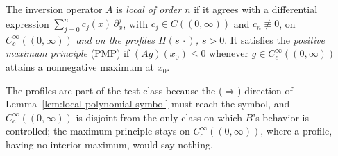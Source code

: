 \begin{definition}\label{def:locality-pmp}
The inversion operator $A$ is \emph{local of order $n$} if it agrees with a differential
expression $\sum_{j=0}^{n} c_j(x)\,\partial_x^j$, with $c_j \in C((0,\infty))$ and
$c_n \not\equiv 0$, on $C_c^\infty((0,\infty))$ \emph{and on the profiles $H(s\,\cdot)$,
$s > 0$}. It satisfies the \emph{positive maximum principle} (PMP) if $(Ag)(x_0) \le 0$
whenever $g \in C_c^\infty((0,\infty))$ attains a nonnegative maximum at $x_0$.

The profiles are part of the test class because the ($\Rightarrow$) direction of
Lemma~\ref{lem:local-polynomial-symbol} must reach the symbol, and $C_c^\infty((0,\infty))$ is
disjoint from the only class on which $B$'s behavior is controlled; the maximum principle
stays on $C_c^\infty((0,\infty))$, where a profile, having no interior maximum, would say
nothing.
\end{definition}

